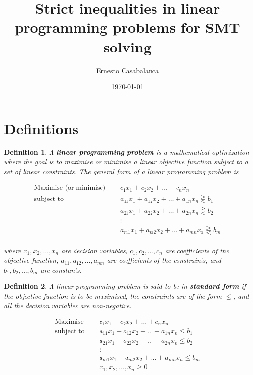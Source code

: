 \documentclass[preview,border=12pt,varwidth]{report}
\title{Strict inequalities in linear programming problems for SMT solving}
\author{Ernesto Casabalanca}
\date{\today}
\newtheorem{definition}{Definition}
\begin{document}
\maketitle

\section*{Definitions}

\begin{definition}
    A \textbf{linear programming problem} is a mathematical optimization where the goal is to maximise or minimise a linear objective function subject to a set of linear constraints. The general form of a linear programming problem is

    \begin{align*}
        \text{Maximise (or minimise) } \quad & c_1x_1 + c_2x_2 + \ldots + c_nx_n                            \\
        \text{subject to }             \quad & a_{11} x_1 + a_{12} x_2 + \ldots + a_{1n} x_n \gtreqless b_1 \\
                                             & a_{21} x_1 + a_{22} x_2 + \ldots + a_{2n} x_n \gtreqless b_2 \\
                                             & \vdots                                                       \\
                                             & a_{m1} x_1 + a_{m2} x_2 + \ldots + a_{mn} x_n \gtreqless b_m \\
    \end{align*}

    where $x_1, x_2, \ldots, x_n$ are decision variables, $c_1, c_2, \ldots, c_n$ are coefficients of the objective function, $a_{11}, a_{12}, \ldots, a_{mn}$ are coefficients of the constraints, and $b_1, b_2, \ldots, b_m$ are constants.
\end{definition}

\begin{definition}
    A linear programming problem is said to be in \textbf{standard form} if the objective function is to be maximised, the constraints are of the form $\leq$, and all the decision variables are non-negative.

    \begin{align*}
        \text{Maximise }   \quad & c_1x_1 + c_2x_2 + \ldots + c_nx_n                       \\
        \text{subject to } \quad & a_{11} x_1 + a_{12} x_2 + \ldots + a_{1n} x_n  \leq b_1 \\
                                 & a_{21} x_1 + a_{22} x_2 + \ldots + a_{2n} x_n \leq b_2  \\
                                 & \vdots                                                  \\
                                 & a_{m1} x_1 + a_{m2} x_2 + \ldots + a_{mn} x_n  \leq b_m \\
                                 & x_1, x_2, \ldots, x_n \geq 0                            \\
    \end{align*}
\end{definition}
\end{document}
